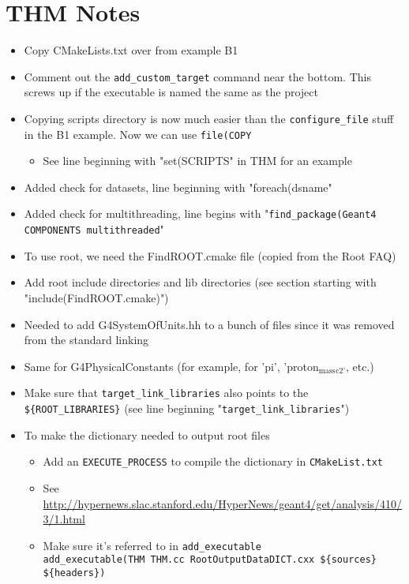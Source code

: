 \documentclass[11pt]{article}
\begin{document}
\section{THM Notes}
\label{sec-3}
\begin{itemize}
\item Copy CMakeLists.txt over from example B1
\item Comment out the \verb~add_custom_target~ command near the bottom. This
screws up if the executable is named the same as the project
\item Copying scripts directory is now much easier than the
    \verb~configure_file~ stuff in the B1 example. Now we can use \verb~file(COPY~
\begin{itemize}
\item See line beginning with "set(SCRIPTS" in THM for an example
\end{itemize}
\item Added check for datasets, line beginning with "foreach(dsname"
\item Added check for multithreading, line begins with
"\verb~find_package(Geant4 COMPONENTS multithreaded~"
\item To use root, we need the FindROOT.cmake file (copied from the Root
FAQ)
\item Add root include directories and lib directories (see section
starting with "include(FindROOT.cmake)")
\item Needed to add G4SystemOfUnits.hh to a bunch of files since it was
removed from the standard linking
\item Same for G4PhysicalConstants (for example, for 'pi',
'proton$_{\text{mass}}$$_{\text{c2'}}$, etc.)
\item Make sure that \verb~target_link_libraries~ also points to the
    \verb~${ROOT_LIBRARIES}~ (see line beginning "\verb~target_link_libraries~")
\item To make the dictionary needed to output root files
\begin{itemize}
\item Add an \verb~EXECUTE_PROCESS~ to compile the dictionary in \verb~CMakeList.txt~
\item See \url{http://hypernews.slac.stanford.edu/HyperNews/geant4/get/analysis/410/3/1.html}
\item Make sure it's referred to in \verb~add_executable~\\
      \verb~add_executable(THM THM.cc RootOutputDataDICT.cxx ${sources} ${headers})~
\end{itemize}
\end{itemize}
\end{document}
